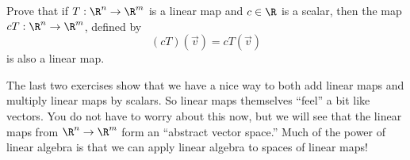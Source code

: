 \documentclass{ximera}
\begin{document}

\begin{question}
  Prove that if $T:\R^n \to \R^m$ is a linear map and $c \in \R$ is a scalar, then the map $cT:\R^n \to \R^m$,  defined by 
  \[(cT)(\vec{v}) = cT(\vec{v})\] is also a linear map.

  \begin{free-response}
  \end{free-response}
\end{question}


\begin{observation}
  The last two exercises show that we have a nice way to both add
  linear maps and multiply linear maps by scalars.  So linear maps
  themselves ``feel'' a bit like vectors.  You do not have to worry
  about this now, but we will see that the linear maps from $\R^n \to
  \R^m$ form an ``abstract vector space.''  Much of the power of
  linear algebra is that we can apply linear algebra to spaces of
  linear maps!
\end{observation}
	
\end{document}

